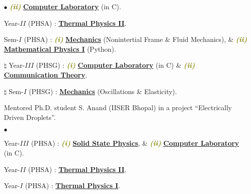 \documentclass[margin,line]{res}
\newenvironment{list1}{
  \begin{list}{\ding{113}}{%
      \setlength{\itemsep}{0in}
      \setlength{\parsep}{0in} \setlength{\parskip}{0in}
      \setlength{\topsep}{0in} \setlength{\partopsep}{0in} 
      \setlength{\leftmargin}{0.17in}}}{\end{list}}
\newenvironment{list2}{
  \begin{list}{$\bullet$}{%
      \setlength{\itemsep}{0in}
      \setlength{\parsep}{0in} \setlength{\parskip}{0in}
      \setlength{\topsep}{0in} \setlength{\partopsep}{0in} 
      \setlength{\leftmargin}{0.2in}}}{\end{list}}
\begin{document}
\begin{resume}
\begin{list2}
                          \textcolor{olive}{\textit{\textbf{(ii)}}} 
                          \href{https://amitbny.github.io/akb.github.io/numerlabVIIIB.html}{\bf Computer Laboratory} (in C). 
\item Year-$II$ (PHSA) : \href{https://amitbny.github.io/akb.github.io/thermphyII.html}{\bf Thermal Physics II}.
\item Sem-$I$ (PHSA) : \textcolor{olive}{\textit{\textbf{(i)}}}
                       \href{https://amitbny.github.io/akb.github.io/sem1H_fluidniner.html}{\bf Mechanics} (Nonintertial Frame \& Fluid Mechanics), 
                       \& \textcolor{olive}{\textit{\textbf{(ii)}}} 
                       \href{https://amitbny.github.io/akb.github.io/sem1H_numerlab.html}{\bf Mathematical Physics I} (Python). 
\item[$\pmb{\natural}$] Year-$III$ (PHSG) : \textcolor{olive}{\textit{\textbf{(i)}}} 
                          \href{https://amitbny.github.io/akb.github.io/numerlabIVB.html}{\bf Computer Laboratory} (in C) \& 
                          \textcolor{olive}{\textit{\textbf{(ii)}}} 
                          \href{https://amitbny.github.io/akb.github.io/commun.html}{\bf Communication Theory}.
\item[$\pmb{\natural}$] Sem-$I$ (PHSG) : \href{https://amitbny.github.io/akb.github.io/sem1G_osc.html}{\bf Mechanics} (Oscillations \& Elasticity). 
\item Mentored Ph.D. student S. Anand (IISER Bhopal) in a project ``{\sf Electrically Driven Droplets}''. 
\end{list2}
\begin{list1}
\item[] \textcolor{iris}{}
\vspace{1mm}
\end{list1}
\begin{list2}
\item Year-$III$ (PHSA) : \textcolor{olive}{\textit{\textbf{(i)}}} 
                          \href{https://amitbny.github.io/akb.github.io/sem6H_SSP.html}{\bf Solid State Physics}, \&  
                          \textcolor{olive}{\textit{\textbf{(ii)}}} 
                          \href{https://amitbny.github.io/akb.github.io/numerlabVIIIB.html}{\bf Computer Laboratory} (in C). 
\item Year-$II$ (PHSA) : \href{https://amitbny.github.io/akb.github.io/thermphyII.html}{\bf Thermal Physics II}.
\item Year-$I$ (PHSA) : \href{https://amitbny.github.io/akb.github.io/thermphyI.html}{\bf Thermal Physics I}. 

\end{list2}
\end{resume}
\end{document}
